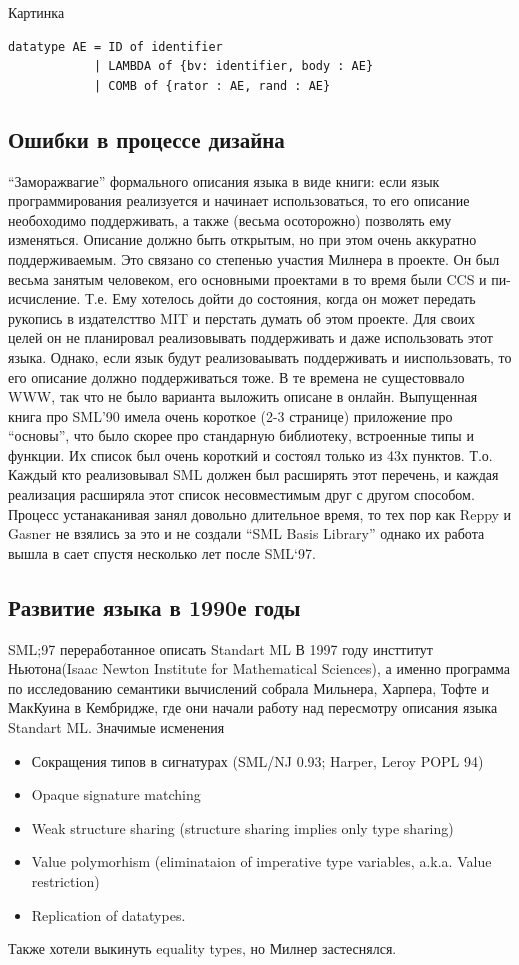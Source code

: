 \documentclass[14pt]{matmex-diploma-custom}
\begin{document}
Картинка
\begin{verbatim}
datatype AE = ID of identifier
            | LAMBDA of {bv: identifier, body : AE}
            | COMB of {rator : AE, rand : AE}
\end{verbatim}

\subsection{Ошибки в процессе дизайна}
“Заморажвагие” формального описания языка в виде книги: если язык программирования реализуется и начинает использоваться, то его описание необоходимо поддерживать, а также (весьма осоторожно) позволять ему изменяться. Описание должно быть открытым, но при этом очень аккуратно поддерживаемым.
Это связано со степенью участия Милнера в проекте. Он был весьма занятым человеком, его основными проектами в то время были CCS и пи-исчисление. Т.е. Ему хотелось дойти до состояния, когда он может передать рукопись в издателсттво MIT  и перстать думать об этом проекте. Для своих целей он не планировал реализовывать поддерживать и даже использовать этот языка. Однако, если язык будут реализоваывать поддерживать и ииспользовать, то его описание должно поддерживаться тоже. В те времена не сущестоввало WWW, так что не было варианта выложить описане в онлайн.
Выпущенная книга про SML’90 имела очень короткое (2-3 странице) приложение про “основы”, что было скорее про стандарную библиотеку, встроенные типы и функции. Их список был очень короткий и состоял только из 43х пунктов. Т.о. Каждый кто реализовывал SML должен был расширять этот перечень, и каждая реализация расширяла этот список несовместимым друг с другом способом. Процесс устанаканивая занял довольно длительное время, то тех пор как Reppy и Gasner не взялись  за это и не создали “SML Basis Library” однако их работа вышла в сает спустя несколько лет после SML‘97.

\subsection{Развитие языка в 1990е годы}
SML;97 переработанное описать Standart ML
В 1997 году инсттитут Ньютона(Isaac Newton Institute for Mathematical Sciences), а именно программа по исследованию семантики вычислений собрала Мильнера, Харпера, Тофте и МакКуина в Кембридже, где они начали работу над пересмотру описания языка Standart ML. Значимые исменения 

\begin{itemize}
 \item Сокращения типов в сигнатурах (SML/NJ 0.93; Harper, Leroy POPL 94)
\item Opaque signature matching
\item Weak structure sharing (structure sharing implies only type sharing) 
\item Value polymorhism (eliminataion of imperative type variables, a.k.a. Value restriction)
\item Replication of datatypes.
\end{itemize}
Также хотели выкинуть equality types, но Милнер застеснялся.
\end{document}
